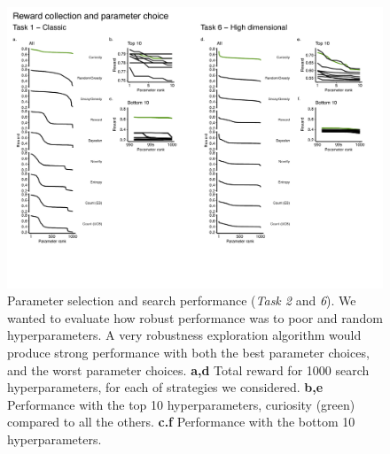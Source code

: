 \begin{figure}
	\begin{fullwidth}
	\includegraphics[width=1\linewidth]{img/robust.pdf} 
	\caption{Parameter selection and search performance (\textit{Task 2} and \textit{6}). We wanted to evaluate how robust performance was to poor and random hyperparameters. A very robustness exploration algorithm would produce strong performance with both the best parameter choices, and the worst parameter choices.   
	\textbf{a,d} Total reward for 1000 search hyperparameters, for each of strategies we considered.  
	\textbf{b,e} Performance with the top 10 hyperparameters, curiosity (green) compared to all the others.
	\textbf{c.f} Performance with the bottom 10 hyperparameters.
	}

\end{fullwidth}
\end{figure}

